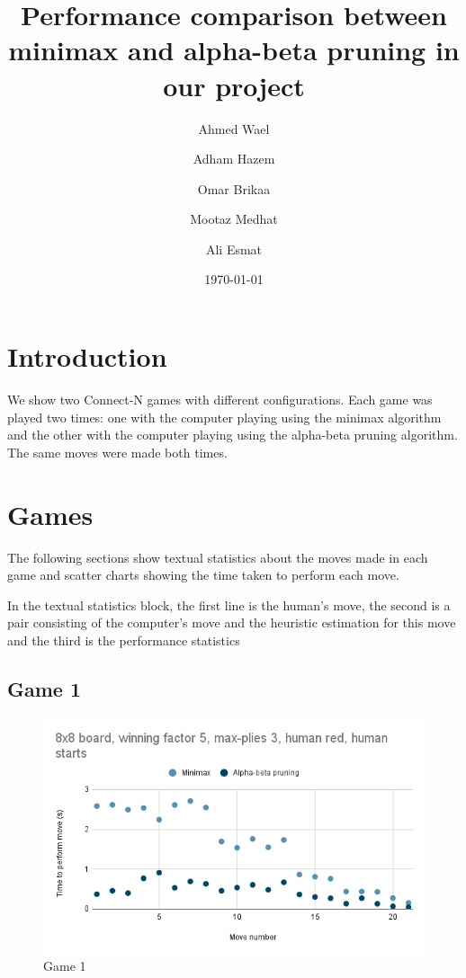 \documentclass[11pt,a4paper]{article}
\begin{document}
\title{Performance comparison between minimax and alpha-beta pruning in our project}
\author{
    Ahmed Wael \and Adham Hazem \and Omar Brikaa \and Mootaz Medhat \and Ali Esmat
}
\date{\today}
\maketitle

\section{Introduction}
We show two Connect-N games with different configurations.
Each game was played two times:
one with the computer playing using the minimax algorithm
and the other with the computer playing using the alpha-beta pruning algorithm.
The same moves were made both times.

\section{Games}
The following sections show textual statistics about the moves made in each game
and scatter charts showing the time taken to perform each move.

In the textual statistics block, the first line is the human's move,
the second is a pair consisting of the computer's move and the heuristic estimation for this move
and the third is the performance statistics

\subsection{Game 1}

\begin{figure}[H]
    \includegraphics[width=\textwidth]{minimax-vs-abp-1}
    \caption{Game 1}
    \label{fig:game_1}
\end{figure}
\end{document}
